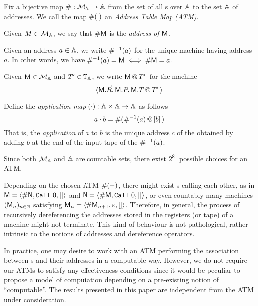 \begin{defi} Fix a bijective map $\# : \mathcal{M}_{\mathbb{A}} \to  \mathbb{A}$ from the set of all \am s over $\mathbb{A}$ to the set $\mathbb{A}$ of addresses.
We call the map $\#(\cdot)$ an \emph{Address Table Map (ATM)}.
\bsub
\item Given $M\in\mathcal{M}_{\mathbb{A}}$, we say that $\# \mathsf M$ is the \emph{address of} $\mathsf M$.
\item
	Given an address $a\in\mathbb{A}$, we write $\#^{-1}(a)$ for the unique machine having address $a$. In other words, we have $\#^{-1}(a) = \mathsf M\iff \#\mathsf M = a$.
\item
	Given $\mathsf M\in\mathcal{M}_{\mathbb{A}}$ and $T'\in\mathbb{T}_{\mathbb{A}}$, we write $\mathsf M\,@\,T'\,$ for the machine
	\[
		\langle \mathsf M.\vec R,\mathsf M.P,\mathsf M.T\,@\,T'\,\rangle
	\]
\item
	Define the \emph{application map} $(\cdot) : \mathbb{A}\times\mathbb{A}\to \mathbb{A}$ as follows
	\[
		a\cdot b = \# (\#^{-1}(a)\,@\,{[}b{]}\,)
	\]
	That is, the \emph{application} of $a$ to $b$ is the unique address $c$ of the \am{} obtained by adding $b$ at the end of the input tape of the \am{} $\#^{-1}(a)$.
\esub
\end{defi}

\noindent
Since both $\mathcal{M}_{\mathbb{A}}$ and $\mathbb{A}$ are countable sets, there exist $2^{\aleph_0}$ possible choices for an ATM\@.
\begin{rem}\label{rem:forever} Depending on the chosen ATM $\#(-)$, there might exist \am s calling each other, as in $\mathsf M = \langle \#\mathsf N,\mathtt{Call}~0,[]\rangle$ and $\mathsf N = \langle \#\mathsf M,\mathtt{Call}~0,[]\rangle$, or even countably many machines $(\mathsf M_n)_{n\in\mathbb{N}}$ satisfying $\mathsf M_n = \langle \#\mathsf M_{n+1},\varepsilon,[]\rangle$.
Therefore, in general, the process of recursively dereferencing the addresses stored in the registers (or tape) of a machine might not terminate.
This kind of behaviour is not pathological, rather intrinsic to the notions of addresses and dereference operators.
\end{rem}
In practice, one may desire to work with an ATM performing the association between \am s and their addresses in a computable way.
However, we do not require our ATMs to satisfy any effectiveness conditions since it would be peculiar to propose a model of computation depending on a pre-existing notion of ``computable''. The results presented in this paper are independent from the ATM  under consideration.


